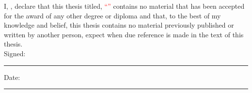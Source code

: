 \documentclass[
12pt, %
english, %
singlespacing, %
headsepline, %
]{MastersDoctoralThesis} %
\begin{document}

\begin{declaration}
\addchaptertocentry{\authorshipname} %

\noindent I, \authorname, declare that this thesis titled, \textcolor{red}{\enquote{\ttitle}} contains no material that has been accepted for the award of any other degree or diploma and that, to the best of my knowledge and belief, this thesis contains no material previously published or written by another person, expect when due reference is made in the text of this thesis.\\
\noindent Signed:\\
\rule[0.5em]{25em}{0.5pt} %
 
\noindent Date:\\
\rule[0.5em]{25em}{0.5pt} %
\end{declaration}

\cleardoublepage

\end{document}
